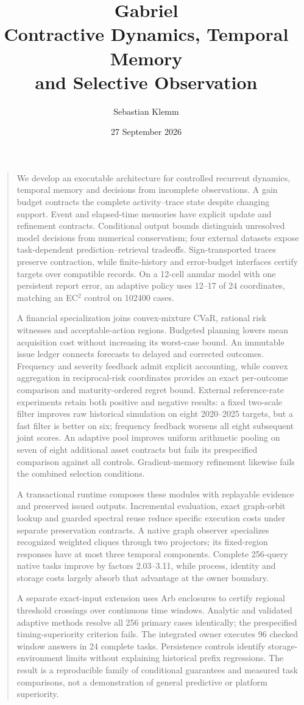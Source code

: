 \documentclass[11pt,a4paper]{article}
\title{\textbf{Gabriel}\\[4pt]\Large Contractive Dynamics, Temporal Memory\\and Selective Observation}
\author{Sebastian Klemm}
\date{27 September 2026}
\renewenvironment{abstract}{\small\begin{center}\bfseries\abstractname\end{center}\begin{quote}\setlength{\parindent}{0pt}\setlength{\parskip}{4pt}}{\end{quote}}
\theoremstyle{definition}\newtheorem{definition}[theorem]{Definition}
\begin{document}
\maketitle
\begin{abstract}
We develop an executable architecture for controlled recurrent dynamics, temporal memory and decisions from incomplete observations. A gain budget contracts the complete activity--trace state despite changing support. Event and elapsed-time memories have explicit update and refinement contracts. Conditional output bounds distinguish unresolved model decisions from numerical conservatism; four external datasets expose task-dependent prediction--retrieval tradeoffs. Sign-transported traces preserve contraction, while finite-history and error-budget interfaces certify targets over compatible records. On a 12-cell annular model with one persistent report error, an adaptive policy uses 12--17 of 24 coordinates, matching an EC$^2$ control on 102400 cases.

A financial specialization joins convex-mixture CVaR, rational risk witnesses and acceptable-action regions. Budgeted planning lowers mean acquisition cost without increasing its worst-case bound. An immutable issue ledger connects forecasts to delayed and corrected outcomes. Frequency and severity feedback admit explicit accounting, while convex aggregation in reciprocal-risk coordinates provides an exact per-outcome comparison and maturity-ordered regret bound. External reference-rate experiments retain both positive and negative results: a fixed two-scale filter improves raw historical simulation on eight 2020--2025 targets, but a fast filter is better on six; frequency feedback worsens all eight subsequent joint scores. An adaptive pool improves uniform arithmetic pooling on seven of eight additional asset contracts but fails its prespecified comparison against all controls. Gradient-memory refinement likewise fails the combined selection conditions.

A transactional runtime composes these modules with replayable evidence and preserved issued outputs. Incremental evaluation, exact graph-orbit lookup and guarded spectral reuse reduce specific execution costs under separate preservation contracts. A native graph observer specializes recognized weighted cliques through two projectors; its fixed-region responses have at most three temporal components. Complete 256-query native tasks improve by factors 2.03--3.11, while process, identity and storage costs largely absorb that advantage at the owner boundary.

A separate exact-input extension uses Arb enclosures to certify regional threshold crossings over continuous time windows. Analytic and validated adaptive methods resolve all 256 primary cases identically; the prespecified timing-superiority criterion fails. The integrated owner executes 96 checked window answers in 24 complete tasks. Persistence controls identify storage-environment limits without explaining historical prefix regressions. The result is a reproducible family of conditional guarantees and measured task comparisons, not a demonstration of general predictive or platform superiority.
\end{abstract}
\end{document}
